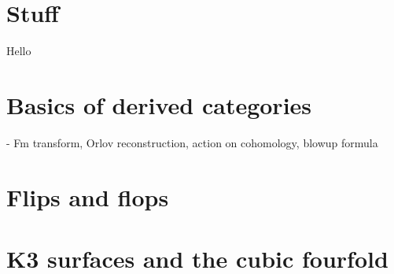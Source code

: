 \section{Stuff}
Hello

\section{Basics of derived categories}
 - Fm transform, Orlov reconstruction, action on cohomology, blowup formula

\section{Flips and flops}


\section{K3 surfaces and the cubic fourfold}

